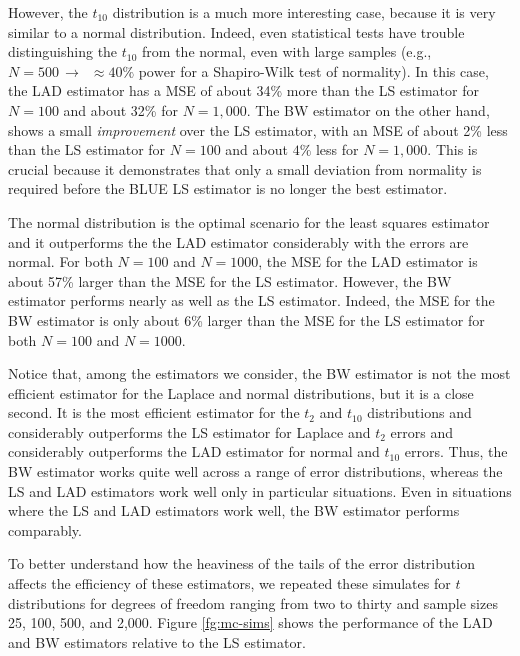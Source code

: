 \documentclass[12pt]{article}
\begin{document}
However, the $t_{10}$ distribution is a much more interesting case, because it is very similar to a normal distribution. Indeed, even statistical tests have trouble distinguishing the $t_{10}$ from the normal, even with large samples (e.g., $N = 500 \, \rightarrow \,\,\, \approx40\% \text{ power}$ for a Shapiro-Wilk test of normality). In this case, the LAD estimator has a MSE of about 34\% more than the LS estimator for $N = 100$ and about 32\% for $N = 1,000$. The BW estimator on the other hand, shows a small \textit{improvement} over the LS estimator, with an MSE of about 2\% less than the LS estimator for $N = 100$ and about $4\%$ less for $N = 1,000$. This is crucial because it demonstrates that only a small deviation from normality is required before the BLUE LS estimator is no longer the best estimator. 

The normal distribution is the optimal scenario for the least squares estimator and it outperforms the the LAD estimator considerably with the errors are normal. For both $N = 100$ and $N = 1000$, the MSE for the LAD estimator is about 57\% larger than the MSE for the LS estimator. However, the BW estimator performs nearly as well as the LS estimator. Indeed, the MSE for the BW estimator is only about 6\% larger than the MSE for the LS estimator for both $N = 100$ and $N = 1000$.

Notice that, among the estimators we consider, the BW estimator is not the most efficient estimator for the Laplace and normal distributions, but it is a close second. It is the most efficient estimator for the $t_2$ and $t_10$ distributions and considerably outperforms the LS estimator for Laplace and $t_2$ errors and considerably outperforms the LAD estimator for normal and $t_{10}$ errors. Thus, the BW estimator works quite well across a range of error distributions, whereas the LS and LAD estimators work well only in particular situations. Even in situations where the LS and LAD estimators work well, the BW estimator performs comparably.

To better understand how the heaviness of the tails of the error distribution affects the efficiency of these estimators, we repeated these simulates for $t$ distributions for degrees of freedom ranging from two to thirty and sample sizes 25, 100, 500, and 2,000. Figure \ref{fg:mc-sims} shows the performance of the LAD and BW estimators relative to the LS estimator.
\end{document}
